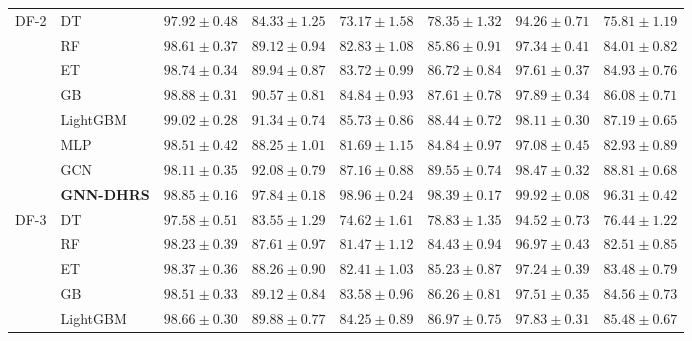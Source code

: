 \documentclass[pdflatex,sn-mathphys-num]{sn-jnl}%
\theoremstyle{thmstyleone}%
\theoremstyle{thmstyletwo}%
\theoremstyle{thmstylethree}%
\begin{document}
\begin{table}[!ht]
{\begin{tabular}{@{}llcccccc@{}}
\midrule

\multirow{8}{*}{DF-2}
& DT
& $97.92\pm0.48$
& $84.33\pm1.25$
& $73.17\pm1.58$
& $78.35\pm1.32$
& $94.26\pm0.71$
& $75.81\pm1.19$ \\

& RF
& $98.61\pm0.37$
& $89.12\pm0.94$
& $82.83\pm1.08$
& $85.86\pm0.91$
& $97.34\pm0.41$
& $84.01\pm0.82$ \\

& ET
& $98.74\pm0.34$
& $89.94\pm0.87$
& $83.72\pm0.99$
& $86.72\pm0.84$
& $97.61\pm0.37$
& $84.93\pm0.76$ \\

& GB
& $98.88\pm0.31$
& $90.57\pm0.81$
& $84.84\pm0.93$
& $87.61\pm0.78$
& $97.89\pm0.34$
& $86.08\pm0.71$ \\

& LightGBM
& $99.02\pm0.28$
& $91.34\pm0.74$
& $85.73\pm0.86$
& $88.44\pm0.72$
& $98.11\pm0.30$
& $87.19\pm0.65$ \\

& MLP
& $98.51\pm0.42$
& $88.25\pm1.01$
& $81.69\pm1.15$
& $84.84\pm0.97$
& $97.08\pm0.45$
& $82.93\pm0.89$ \\

& GCN
& $98.11\pm0.35$
& $92.08\pm0.79$
& $87.16\pm0.88$
& $89.55\pm0.74$
& $98.47\pm0.32$
& $88.81\pm0.68$ \\

& \textbf{GNN-DHRS}
& \textbf{$98.85\pm0.16$}
& \textbf{$97.84\pm0.18$}
& \textbf{$98.96\pm0.24$}
& \textbf{$98.39\pm0.17$}
& \textbf{$99.92\pm0.08$}
& \textbf{$96.31\pm0.42$} \\

\midrule

\multirow{8}{*}{DF-3}
& DT
& $97.58\pm0.51$
& $83.55\pm1.29$
& $74.62\pm1.61$
& $78.83\pm1.35$
& $94.52\pm0.73$
& $76.44\pm1.22$ \\

& RF
& $98.23\pm0.39$
& $87.61\pm0.97$
& $81.47\pm1.12$
& $84.43\pm0.94$
& $96.97\pm0.43$
& $82.51\pm0.85$ \\

& ET
& $98.37\pm0.36$
& $88.26\pm0.90$
& $82.41\pm1.03$
& $85.23\pm0.87$
& $97.24\pm0.39$
& $83.48\pm0.79$ \\

& GB
& $98.51\pm0.33$
& $89.12\pm0.84$
& $83.58\pm0.96$
& $86.26\pm0.81$
& $97.51\pm0.35$
& $84.56\pm0.73$ \\

& LightGBM
& $98.66\pm0.30$
& $89.88\pm0.77$
& $84.25\pm0.89$
& $86.97\pm0.75$
& $97.83\pm0.31$
& $85.48\pm0.67$ \\


\end{tabular}}
\end{table}
\end{document}
